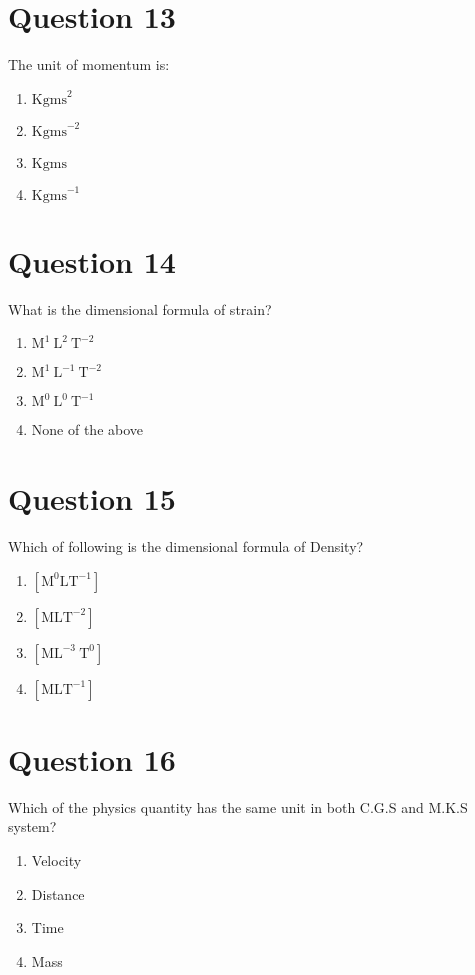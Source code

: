 \documentclass{article}
\begin{document}
\section*{Question 13}
The unit of momentum is:
\begin{enumerate}[label=(\alph*)]
\item \(\mathrm{Kgms}^{2}\)
\item \(\mathrm{Kgms}^{-2}\)
\item \(\mathrm{Kgms}\)
\item \(\mathrm{Kgms}^{-1}\)
\end{enumerate}
\newpage
\section*{Question 14}
What is the dimensional formula of strain?
\begin{enumerate}[label=(\alph*)]
\item \(\mathrm{M}^{1} \mathrm{~L}^{2} \mathrm{~T}^{-2}\)
\item \(\mathrm{M}^{1} \mathrm{~L}^{-1} \mathrm{~T}^{-2}\)
\item \(\mathrm{M}^{0} \mathrm{~L}^{0} \mathrm{~T}^{-1}\)
\item None of the above
\end{enumerate}
\newpage
\section*{Question 15}
Which of following is the dimensional formula of Density?
\begin{enumerate}[label=(\alph*)]
\item \(\left[\mathrm{M}^{0} \mathrm{LT}^{-1}\right]\)
\item \(\left[\mathrm{MLT}^{-2}\right]\)
\item \(\left[\mathrm{ML}^{-3} \mathrm{~T}^{0}\right]\)
\item \(\left[\mathrm{MLT}^{-1}\right]\)
\end{enumerate}
\newpage
\section*{Question 16}
Which of the physics quantity has the same unit in both C.G.S and M.K.S system?
\begin{enumerate}[label=(\alph*)]
\item Velocity
\item Distance
\item Time
\item Mass
\end{enumerate}
\newpage
\end{document}
